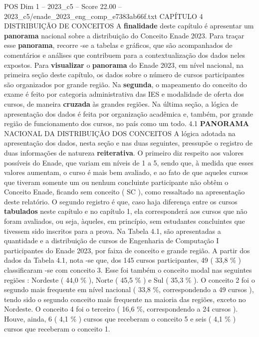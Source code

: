 \begin{textsample}{POS Dim 1 – 2023\_c5 – Score 22.00 – 2023\_c5/enade\_2023\_eng\_comp\_e7383ab66f.txt}  \label{ex:f1_pos_004}
CAPÍTULO 4 DISTRIBUIÇÃO DE CONCEITOS A \textbf{finalidade} deste capítulo é apresentar um \textbf{panorama} nacional sobre a distribuição do Conceito Enade 2023.
Para traçar esse \textbf{panorama}, recorre -se a tabelas e gráficos, que são acompanhados de comentários e análises que contribuem para a contextualização dos dados neles expostos.
Para \textbf{visualizar} o \textbf{panorama} do Enade 2023, em nível nacional, na primeira seção deste capítulo, os dados sobre o número de cursos participantes são organizados por grande região.
Na \textbf{segunda}, o mapeamento do conceito do exame é feito por categoria administrativa das IES e modalidade de oferta dos cursos, de maneira \textbf{cruzada} às grandes regiões.
Na última seção, a lógica de apresentação dos dados é feita por organização acadêmica e, também, por grande região de funcionamento dos cursos, no país como um todo. 4.1 \textbf{PANORAMA} NACIONAL DA DISTRIBUIÇÃO DOS CONCEITOS A lógica adotada na apresentação dos dados, nesta seção e nas duas seguintes, pressupõe o registro de duas informações de natureza \textbf{reiterativa}.
O primeiro diz respeito aos valores possíveis do Enade, que variam em níveis de 1 a 5, sendo que, à medida que esses valores aumentam, o curso é mais bem avaliado, e ao fato de que aqueles cursos que tiveram somente um ou nenhum concluinte participante não obtêm o Conceito Enade, ficando sem conceito ( SC ), como ressaltado na apresentação deste relatório.
O segundo registro é que, caso haja diferença entre os cursos \textbf{tabulados} neste capítulo e no capítulo 1, ela corresponderá aos cursos que não foram avaliados, ou seja, àqueles, em princípio, sem estudantes concluintes que tivessem sido inscritos para a prova.
Na Tabela 4.1, são apresentadas a quantidade e a distribuição de cursos de Engenharia de Computação I participantes do Enade 2023, por faixa de conceito e grande região.
A partir dos dados da Tabela 4.1, nota -se que, dos 145 cursos participantes, 49 ( 33,8 \% ) classificaram -se com conceito 3.
Esse foi também o conceito modal nas seguintes regiões : Nordeste ( 44,0 \% ), Norte ( 45,5 \% ) e Sul ( 35,3 \% ).
O conceito 2 foi o segundo mais frequente em nível nacional ( 33,8 \%, correspondendo a 49 cursos ), tendo sido o segundo conceito mais frequente na maioria das regiões, exceto no Nordeste.
O conceito 4 foi o terceiro ( 16,6 \%, correspondendo a 24 cursos ).
Houve, ainda, 6 ( 4,1 \% ) cursos que receberam o conceito 5 e seis ( 4,1 \% ) cursos que receberam o conceito 1.

\end{textsample}
